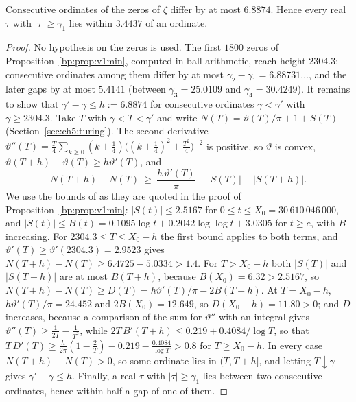 \begin{lemma}\label{yo:lem:gap}
Consecutive ordinates of the zeros of $\zeta$ differ by at most $6.8874$. Hence every real $\tau$ with $|\tau|\ge\gamma_1$ lies within $3.4437$ of an ordinate.
\end{lemma}

\begin{proof}
No hypothesis on the zeros is used. The first $1800$ zeros of Proposition~\ref{bp:prop:v1min}, computed in ball arithmetic, reach height $2304.3$: consecutive ordinates among them differ by at most $\gamma_2-\gamma_1=6.88731\ldots$, and the later gaps by at most $5.4141$ (between $\gamma_3=25.0109$ and $\gamma_4=30.4249$). It remains to show that $\gamma'-\gamma\le h:=6.8874$ for consecutive ordinates $\gamma<\gamma'$ with $\gamma\ge2304.3$. Take $T$ with $\gamma<T<\gamma'$ and write $N(T)=\vartheta(T)/\pi+1+S(T)$ (Section~\ref{sec:ch5:turing}). The second derivative $\vartheta''(T)=\frac T4\sum_{k\ge0}(k+\frac14)\bigl((k+\frac14)^2+\frac{T^2}4\bigr)^{-2}$ is positive, so $\vartheta$ is convex, $\vartheta(T+h)-\vartheta(T)\ge h\vartheta'(T)$, and
\[
N(T+h)-N(T)\ \ge\ \frac{h\,\vartheta'(T)}\pi-|S(T)|-|S(T+h)| .
\]
We use the bounds of \cite{HSW22} as they are quoted in the proof of Proposition~\ref{bp:prop:v1min}: $|S(t)|\le2.5167$ for $0\le t\le X_0=30\,610\,046\,000$, and $|S(t)|\le B(t)=0.1095\log t+0.2042\log\log t+3.0305$ for $t\ge e$, with $B$ increasing. For $2304.3\le T\le X_0-h$ the first bound applies to both terms, and $\vartheta'(T)\ge\vartheta'(2304.3)=2.9523$ gives $N(T+h)-N(T)\ge6.4725-5.0334>1.4$. For $T>X_0-h$ both $|S(T)|$ and $|S(T+h)|$ are at most $B(T+h)$, because $B(X_0)=6.32>2.5167$, so $N(T+h)-N(T)\ge D(T)=h\vartheta'(T)/\pi-2B(T+h)$. At $T=X_0-h$, $h\vartheta'(T)/\pi=24.452$ and $2B(X_0)=12.649$, so $D(X_0-h)=11.80>0$; and $D$ increases, because a comparison of the sum for $\vartheta''$ with an integral gives $\vartheta''(T)\ge\frac1{2T}-\frac1{T^2}$, while $2T\,B'(T+h)\le0.219+0.4084/\log T$, so that $T\,D'(T)\ge\frac h{2\pi}(1-\frac2T)-0.219-\frac{0.4084}{\log T}>0.8$ for $T\ge X_0-h$. In every case $N(T+h)-N(T)>0$, so some ordinate lies in $(T,T+h]$, and letting $T\downarrow\gamma$ gives $\gamma'-\gamma\le h$. Finally, a real $\tau$ with $|\tau|\ge\gamma_1$ lies between two consecutive ordinates, hence within half a gap of one of them.
\end{proof}

